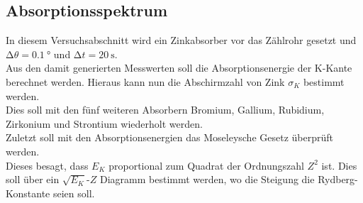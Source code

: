 \subsection{Absorptionsspektrum}

In diesem Versuchsabschnitt wird ein Zinkabsorber vor das Zählrohr gesetzt und $\increment \theta=\SI{0.1}{\degree}$ und $\increment t=\SI{20}{\second}$.\\
Aus den damit generierten Messwerten soll die Absorptionsenergie der K-Kante berechnet werden. Hieraus kann nun die Abschirmzahl von Zink $\sigma_K$ bestimmt werden.\\
Dies soll mit den fünf weiteren Absorbern Bromium, Gallium, Rubidium, Zirkonium und Strontium wiederholt werden.\\
Zuletzt soll mit den Absorptionsenergien das Moseleysche Gesetz überprüft werden.\\
Dieses besagt, dass $E_K$ proportional zum Quadrat der Ordnungszahl $Z^2$ ist. Dies soll über ein $\sqrt{E_K}$-$Z$ Diagramm bestimmt werden, wo die Steigung die Rydberg-Konstante seien soll. 